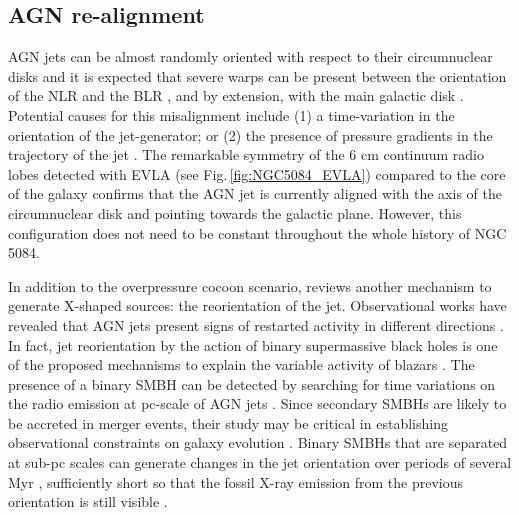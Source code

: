 \documentclass[modern]{CORE-AAS/aastex631}
\begin{document}
{\subsection{AGN re-alignment}
\label{subsec:discussion_realignment}

AGN jets can be almost randomly oriented with respect to their circumnuclear disks \citep{schmitt+2002apj575_150}  and it is expected that severe warps can be present between the orientation of the NLR and the BLR \citep{lawrence+2010apj714_561}, and by extension, with the main galactic disk \citep{clarke+1998apj495_189, nagar+1999apj516_97, kinney+2000apj537_152}. Potential causes for this misalignment include (1) a time-variation in the orientation of the jet-generator; or (2) the presence of pressure gradients in the trajectory of the jet \citep{gallimore+2006aj132_546}. The remarkable symmetry of the 6 cm continuum radio lobes detected with EVLA (see Fig.\,\ref{fig:NGC5084_EVLA}) compared to the core of the galaxy confirms that the AGN jet is currently aligned with the axis of the circumnuclear disk and pointing towards the galactic plane. However, this configuration does not need to be constant throughout the whole history of NGC\,5084. 

In addition to the overpressure cocoon scenario, \citet{giri+2024sci11_1371101} reviews another mechanism to generate X-shaped sources: the reorientation of the jet. Observational works have revealed that AGN jets present signs of restarted activity in different directions  \citep{saripalli+2013mnras436_690, nandi+2021apj908_178}. In fact, jet reorientation by the action of binary supermassive black holes is one of the proposed mechanisms to explain the variable activity of blazars \citep{britzen+2018mnras478_3199}. The presence of a binary SMBH can be detected by searching for time variations on the radio emission at pc-scale of AGN jets \citep{jiang+2023apj959_11}. Since secondary SMBHs are likely to be accreted in merger events, their study may be critical in establishing observational constraints on galaxy evolution \citep{yu2002mnras331_935}. Binary SMBHs that are separated at sub-pc scales can generate changes in the jet orientation over periods of several Myr \citep{giri+2024sci11_1371101}, sufficiently short so that the fossil X-ray emission from the previous orientation is still visible \citep[$\sim10-20$ Myr]{zubovas+2022mnras515_1705}. 

}
\end{document}
